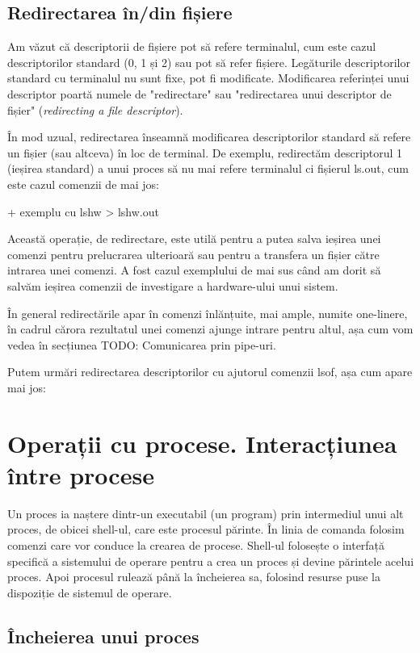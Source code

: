 \subsection{Redirectarea în/din fișiere}
\label{sec:procese-fisiere-redirectare}

Am văzut că descriptorii de fișiere pot să refere terminalul, cum este cazul
descriptorilor standard (0, 1 și 2) sau pot să refer fișiere. Legăturile
descriptorilor standard cu terminalul nu sunt fixe, pot fi modificate.
Modificarea referinței unui descriptor poartă numele de "redirectare" sau
"redirectarea unui descriptor de fișier" (\textit{redirecting a file descriptor}).

În mod uzual, redirectarea înseamnă modificarea descriptorilor standard să
refere un fișier (sau altceva) în loc de terminal. De exemplu, redirectăm
descriptorul 1 (ieșirea standard) a unui proces să nu mai refere terminalul ci
fișierul ls.out, cum este cazul comenzii de mai jos:

+ exemplu cu lshw > lshw.out

Această operație, de redirectare, este utilă pentru a putea salva ieșirea unei
comenzi pentru prelucrarea ulterioară sau pentru a transfera un fișier către
intrarea unei comenzi. A fost cazul exemplului de mai sus când am dorit să
salvăm ieșirea comenzii de investigare a hardware-ului unui sistem.

În general redirectările apar în comenzi înlănțuite, mai ample, numite
one-linere, în cadrul cărora rezultatul unei comenzi ajunge intrare pentru
altul, așa cum vom vedea în secțiunea TODO: Comunicarea prin pipe-uri.

Putem urmări redirectarea descriptorilor cu ajutorul comenzii lsof, așa cum apare mai jos:

\section{Operații cu procese. Interacțiunea între procese}
\label{sec:procese-operatii}

Un proces ia naștere dintr-un executabil (un program) prin intermediul unui alt
proces, de obicei shell-ul, care este procesul părinte. În linia de comanda
folosim comenzi care vor conduce la crearea de procese. Shell-ul folosește o
interfață specifică a sistemului de operare pentru a crea un proces și devine
părintele acelui proces. Apoi procesul rulează până la încheierea sa, folosind
resurse puse la dispoziție de sistemul de operare.

\subsection{Încheierea unui proces}
\label{sec:procese-operatii-incheiere}

